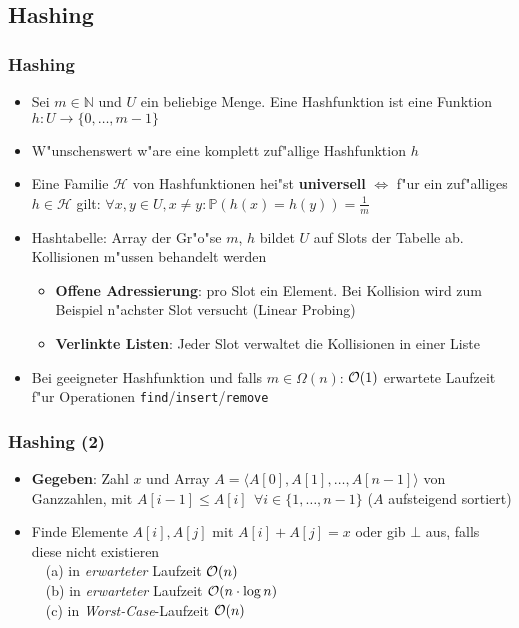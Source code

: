 \subsection{Hashing}
\begin{frame}
  \frametitle{Hashing}
  \begin{itemize}
  \item Sei $m \in \mathbb{N}$ und $U$ ein beliebige Menge.
        Eine Hashfunktion ist eine Funktion $h : U \rightarrow \{0,\ldots,m-1\}$
  \item W"unschenswert w"are eine komplett zuf"allige Hashfunktion $h$
  \item Eine Familie $\mathscr{H}$ von Hashfunktionen hei"st \textbf{universell} $\iff$
        f"ur ein zuf"alliges $h \in \mathscr{H}$ gilt:
        $\forall x, y \in U, x \neq y: \mathbb{P}(h(x) = h(y)) = \frac{1}{m}$
  \item Hashtabelle: Array der Gr"o"se $m$, $h$ bildet $U$ auf Slots der
        Tabelle ab. Kollisionen m"ussen behandelt werden
    \begin{itemize}
      \item \textbf{Offene Adressierung}: pro Slot ein Element. Bei Kollision wird zum
            Beispiel n"achster Slot versucht (Linear Probing)
      \item \textbf{Verlinkte Listen}: Jeder Slot verwaltet die Kollisionen in einer Liste
    \end{itemize}
  \item Bei geeigneter Hashfunktion und falls $m \in \Omega(n)$:
        $\mathcal{O}(1)$ erwartete Laufzeit f"ur Operationen
        \lstinline|find|/\lstinline|insert|/\lstinline|remove|
  \end{itemize}
\end{frame}

\begin{frame}
  \frametitle{Hashing (2)}
  \begin{itemize}
  \item \textbf{Gegeben}: Zahl $x$ und Array $A = \langle A[0], A[1], \ldots, A[n-1] \rangle$
        von Ganzzahlen, mit $A[i-1] \leq A[i] \ \ \forall i \in \{1,\ldots,n-1\}$ ($A$ aufsteigend sortiert)
  \item Finde Elemente $A[i], A[j]$ mit $A[i] + A[j] = x$ oder gib $\bot$ aus, falls
        diese nicht existieren \\
    \ \ (a) in \emph{erwarteter} Laufzeit $\mathcal{O}(n)$ \\
    \ \ (b) in \emph{erwarteter} Laufzeit $\mathcal{O}(n \cdot \log n)$ \\
    \ \ (c) in \emph{Worst-Case}-Laufzeit $\mathcal{O}(n)$
  \end{itemize}
\end{frame}

